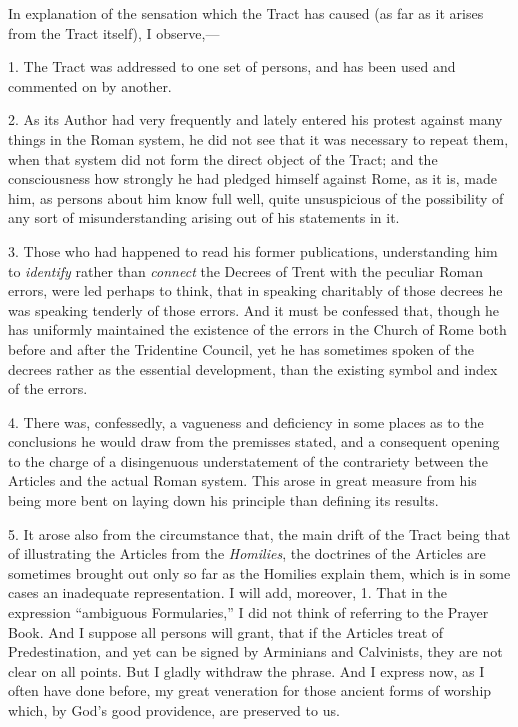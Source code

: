 In explanation of the sensation which the Tract
has caused (as far as it arises from the Tract itself), I observe,—

1. The Tract was addressed to one set of persons,
and has been used and commented on by another.

2. As its Author had very frequently and lately
entered his protest against many things in the Roman system, he did
not see that it was necessary to repeat them, when that system did not
form the direct object of the Tract; and the consciousness how
strongly he had pledged himself against Rome, as it is, made him, as
persons about him know full well, quite unsuspicious of the
possibility of any sort of misunderstanding arising out of his
statements in it.

3. Those who had happened to read his former
publications, understanding him to \emph{identify} rather than \emph{connect}
the Decrees of Trent with the peculiar Roman errors, were led perhaps
to think, that in speaking charitably of those decrees he was speaking
tenderly of those errors. And it must be confessed that, though he has
uniformly maintained the existence of the errors in the Church of Rome
both before and after the Tridentine Council, yet he has sometimes
spoken of the decrees rather as the essential development, than the
existing symbol and index of the errors.

4. There was, confessedly, a vagueness and
deficiency in some places as to the conclusions he would draw from the
premisses stated, and a consequent opening to the charge of a
disingenuous understatement of the contrariety between the Articles
and the actual Roman system. This arose in great measure from his
being more bent on laying down his principle than defining its
results.

5. It arose also from the circumstance that, the
main drift of the Tract being that of illustrating the Articles from
the \emph{Homilies}, the doctrines of the Articles are sometimes
brought out only so far as the Homilies explain them, which is in some
cases an inadequate representation. I will add, moreover, 1. That in the expression ``ambiguous Formularies,''
I did not think of referring to the Prayer Book. And I suppose
all persons will grant, that if the Articles treat of Predestination,
and yet can be signed by Arminians and Calvinists, they are not clear
on all points. But I gladly withdraw the phrase. And I express now, as
I often have done before, my great veneration for those ancient forms
of worship which, by God's good providence, are preserved to us.

